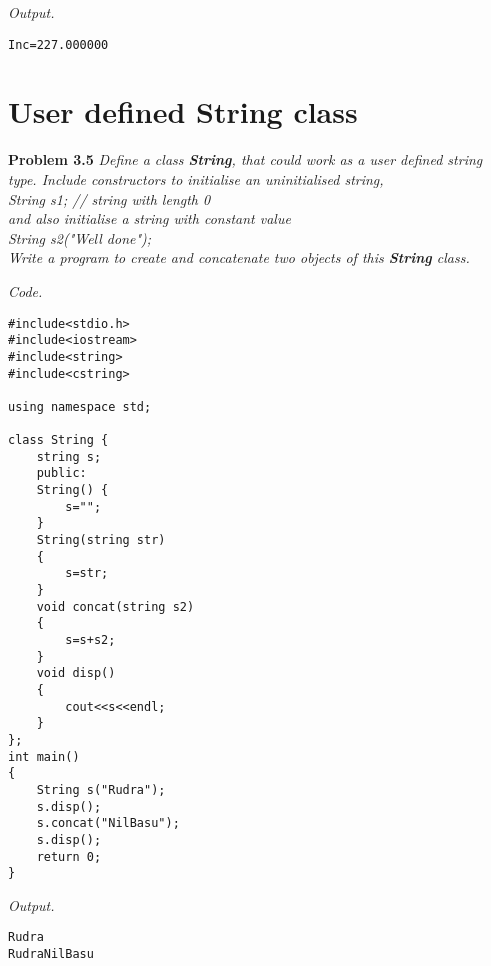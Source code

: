 \documentclass[12pt]{article}
\begin{document}
\textit{Output.}
\begin{lstlisting}
Inc=227.000000
\end{lstlisting}


\section{User defined String class}

\textbf{Problem 3.5} \textit{Define a class \textbf{String}, that could work as a user defined string type. Include constructors to initialise an uninitialised string,\\
String s1; // string with length 0\\
and also initialise a string with constant value
\\String s2("Well done");\\
Write a program to create and concatenate two objects of this \textbf{String} class.
}

\textit{Code.}
\begin{lstlisting}
#include<stdio.h>
#include<iostream>
#include<string>
#include<cstring>

using namespace std;

class String {
	string s;
	public:
	String() {
		s="";
	}
	String(string str)
	{
		s=str;
	}
	void concat(string s2)
	{
		s=s+s2;
	}
	void disp()
	{
		cout<<s<<endl;
	}
};
int main()
{
	String s("Rudra");
	s.disp();
	s.concat("NilBasu");
	s.disp();
	return 0;
}
\end{lstlisting}

\textit{Output.}
\begin{lstlisting}
Rudra
RudraNilBasu
\end{lstlisting}
\end{document}
